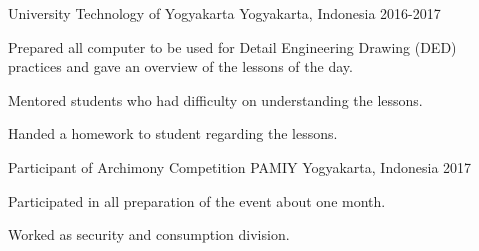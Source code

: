 \begin{cventries}
	{University Technology of Yogyakarta} %
	{Yogyakarta, Indonesia} %
	{2016-2017} %
	{
		\begin{cvitems} %
			\item {Prepared all computer to be used for Detail Engineering Drawing (DED) practices and gave an overview of the lessons of the day.}
			\item{Mentored students who had difficulty on understanding the lessons.}
			\item{Handed a homework to student regarding the lessons.}
		\end{cvitems}
	}
	\cventry
	{Participant of Archimony Competition} %
	{PAMIY} %
	{Yogyakarta, Indonesia} %
	{2017} %
	{
		\begin{cvitems} %
			\item{Participated in all preparation of the event about one month.}
			\item {Worked as security and consumption division.}
		\end{cvitems}
	}
\end{cventries}
